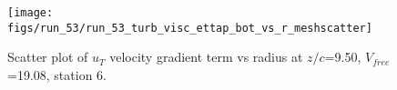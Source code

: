 \begin{figure}[H]
\centering
\texttt{[image: figs/run\_53/run\_53\_turb\_visc\_ettap\_bot\_vs\_r\_meshscatter]}
\caption{Scatter plot of $
u_T$ velocity gradient term vs radius at $z/c$=9.50, $V_{free}$=19.08, station 6.}
\end{figure}


